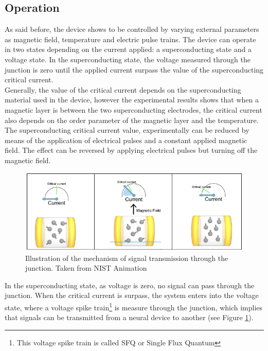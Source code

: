 \documentclass[12pt]{article}
\begin{document}
\subsection{Operation}
As said before, the device shows to be controlled by varying external parameters as magnetic field, temperature and electric pulse trains. The device can operate in two states depending on the current applied: a superconducting state and a voltage state. In the superconducting state, the voltage measured through the junction is zero until the applied current surpass the value of the superconducting critical current.  \\

Generally, the value of the critical current depends on the superconducting material used in the device, however the experimental results shows that when a magnetic layer is between the two superconducting electrodes, the critical current also depends on the order parameter of the magnetic layer and the temperature. The superconducting critical current value, experimentally can be reduced by means of the application of electrical pulses and a constant applied magnetic field. The effect can be reversed by applying electrical pulses but turning off the magnetic field.\\

\begin{figure}[ht]
    \centering
    \includegraphics[scale=0.75]{CurrentBehavior.png}
    \caption{Illustration of the mechanism of signal transmission through the junction. Taken from NIST Animation \cite{NISTIlus}}
    \label{CurrentBehave}
\end{figure}


In the superconducting state, as voltage is zero, no signal can pass through the junction. When the critical current is surpass, the system enters into the voltage state, where a voltage spike train\footnote{This voltage spike train is called SFQ or Single Flux Quantum} is measure through the junction, which implies that signals can be transmitted from a neural device to another (see Figure \ref{CurrentBehave}).  \\
\end{document}
